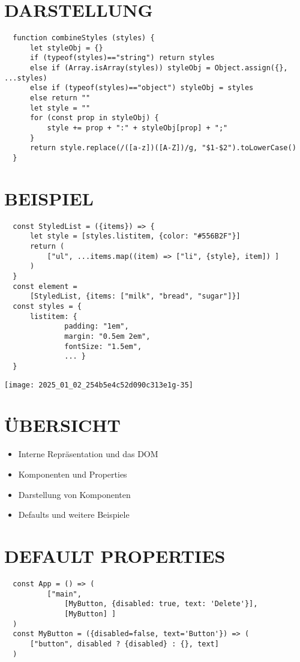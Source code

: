   \section*{DARSTELLUNG}
  \begin{verbatim}
  function combineStyles (styles) {
      let styleObj = {}
      if (typeof(styles)=="string") return styles
      else if (Array.isArray(styles)) styleObj = Object.assign({}, ...styles)
      else if (typeof(styles)=="object") styleObj = styles
      else return ""
      let style = ""
      for (const prop in styleObj) {
          style += prop + ":" + styleObj[prop] + ";"
      }
      return style.replace(/([a-z])([A-Z])/g, "$1-$2").toLowerCase()
  }
  \end{verbatim}
  
  \section*{BEISPIEL}
  \begin{verbatim}
  const StyledList = ({items}) => {
      let style = [styles.listitem, {color: "#556B2F"}]
      return (
          ["ul", ...items.map((item) => ["li", {style}, item]) ]
      )
  }
  const element =
      [StyledList, {items: ["milk", "bread", "sugar"]}]
  const styles = {
      listitem: {
              padding: "1em",
              margin: "0.5em 2em",
              fontSize: "1.5em",
              ... }
  }
  \end{verbatim}
  
  \begin{center}
  \texttt{[image: 2025\_01\_02\_254b5e4c52d090c313e1g-35]}
  \end{center}
  
  \section*{ÜBERSICHT}
  \begin{itemize}
    \item Interne Repräsentation und das DOM
    \item Komponenten und Properties
    \item Darstellung von Komponenten
    \item Defaults und weitere Beispiele
  \end{itemize}
  
  \section*{DEFAULT PROPERTIES}
  \begin{verbatim}
  const App = () => (
          ["main",
              [MyButton, {disabled: true, text: 'Delete'}],
              [MyButton] ]
  )
  const MyButton = ({disabled=false, text='Button'}) => (
      ["button", disabled ? {disabled} : {}, text]
  )
  \end{verbatim}
  
